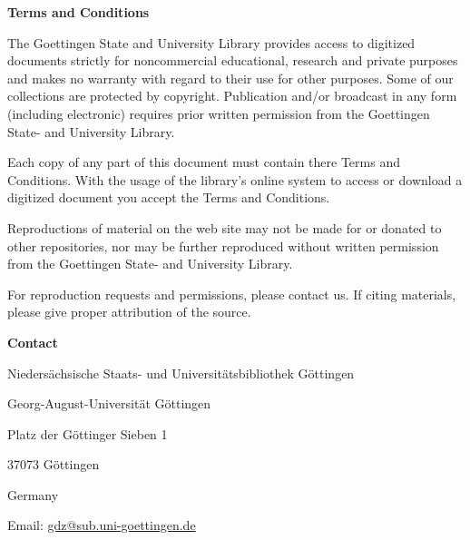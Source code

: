 \textbf{Terms and Conditions}

The Goettingen State and University Library provides access to digitized documents strictly for noncommercial educational, research and private purposes and makes no warranty with regard to their use for other purposes. Some of our collections are protected by copyright. Publication and/or broadcast in any form (including electronic) requires prior written permission from the Goettingen State- and University Library.

Each copy of any part of this document must contain there Terms and Conditions. With the usage of the library's online system to access or download a digitized document you accept the Terms and Conditions.

Reproductions of material on the web site may not be made for or donated to other repositories, nor may be further reproduced without written permission from the Goettingen State- and University Library.

For reproduction requests and permissions, please contact us. If citing materials, please give proper attribution of the source.

\textbf{Contact}

Niedersächsische Staats- und Universitätsbibliothek Göttingen\par
Georg-August-Universität Göttingen\par
Platz der Göttinger Sieben 1\par
37073 Göttingen\par
Germany\par
Email: \href{mailto:gdz@sub.uni-goettingen.de}{gdz@sub.uni-goettingen.de}
\clearpage
\endgroup
